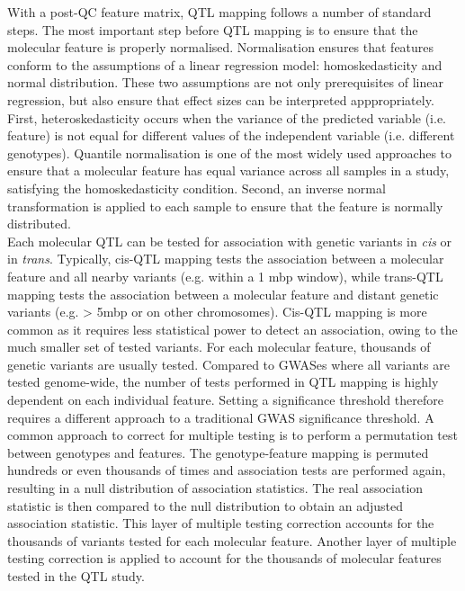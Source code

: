 With a post-QC feature matrix, QTL mapping follows a number of standard steps. The most important step before QTL mapping is to ensure that the molecular feature is properly normalised. Normalisation ensures that features conform to the assumptions of a linear regression model: homoskedasticity and normal distribution. These two assumptions are not only prerequisites of linear regression, but also ensure that effect sizes can be interpreted apppropriately. First, heteroskedasticity occurs when the variance of the predicted variable (i.e. feature) is not equal for different values of the independent variable (i.e. different genotypes). Quantile normalisation is one of the most widely used approaches to ensure that a molecular feature has equal variance across all samples in a study, satisfying the homoskedasticity condition. Second, an inverse normal transformation is applied to each sample to ensure that the feature is normally distributed.\\ 

Each molecular QTL can be tested for association with genetic variants in \textit{cis} or in \textit{trans}. Typically, cis-QTL mapping tests the association between a molecular feature and all nearby variants (e.g. within a 1 mbp window), while trans-QTL mapping tests the association between a molecular feature and distant genetic variants (e.g. > 5mbp or on other chromosomes). Cis-QTL mapping is more common as it requires less statistical power to detect an association, owing to the much smaller set of tested variants. For each molecular feature, thousands of genetic variants are usually tested. Compared to GWASes where all variants are tested genome-wide, the number of tests performed in QTL mapping is highly dependent on each individual feature. Setting a significance threshold therefore requires a different approach to a traditional GWAS significance threshold. A common approach to correct for multiple testing is to perform a permutation test between genotypes and features. The genotype-feature mapping is permuted hundreds or even thousands of times and association tests are performed again, resulting in a null distribution of association statistics. The real association statistic is then compared to the null distribution to obtain an adjusted association statistic. This layer of multiple testing correction accounts for the thousands of variants tested for each molecular feature. Another layer of multiple testing correction is applied to account for the thousands of molecular features tested in the QTL study. \\


